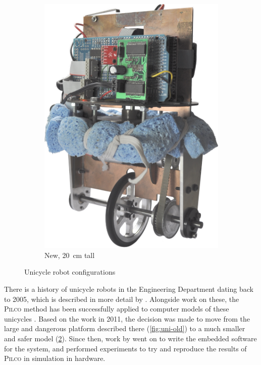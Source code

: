\documentclass[main.tex]{subfiles}
\begin{document}
\begin{figure}[!b]
\begin{subfigure}{0.3\linewidth}
			\includegraphics[width=\linewidth]{figures/front.jpg}
			\caption{New, \SI{20}{\centi\meter} tall}
			\label{fig:uni-new}
		\end{subfigure}
		\hspace*{\fill}
		\caption{Unicycle robot configurations}
	\end{figure}

	There is a history of unicycle robots in the Engineering Department dating back to 2005, which is described in more detail by \citeauthor{queiro} \cite{queiro}.
	Alongside work on these, the \textsc{Pilco} method has been successfully applied to computer models of these unicycles  \cite[section~3.3]{pilco}.
	Based on the work in 2011, the decision was made to move from the large and dangerous platform described there (\cref{fig:uni-old}) to a much smaller and safer model (\cref{fig:uni-new}).
	Since then, work by \citeauthor{aleksi} \cite{aleksi} went on to write the embedded software for the system, and performed experiments to try and reproduce the results of \textsc{Pilco} in simulation in hardware.
\end{document}
